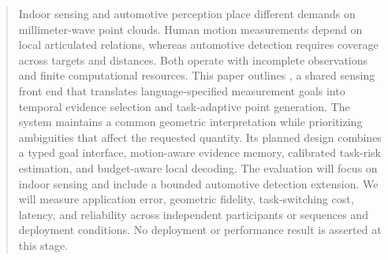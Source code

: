 \begin{abstract}
Indoor sensing and automotive perception place different demands on millimeter-wave point clouds. Human motion measurements depend on local articulated relations, whereas automotive detection requires coverage across targets and distances. Both operate with incomplete observations and finite computational resources. This paper outlines \TaskRadar, a shared sensing front end that translates language-specified measurement goals into temporal evidence selection and task-adaptive point generation. The system maintains a common geometric interpretation while prioritizing ambiguities that affect the requested quantity. Its planned design combines a typed goal interface, motion-aware evidence memory, calibrated task-risk estimation, and budget-aware local decoding. The evaluation will focus on indoor sensing and include a bounded automotive detection extension. We will measure application error, geometric fidelity, task-switching cost, latency, and reliability across independent participants or sequences and deployment conditions. No deployment or performance result is asserted at this stage.
\end{abstract}
